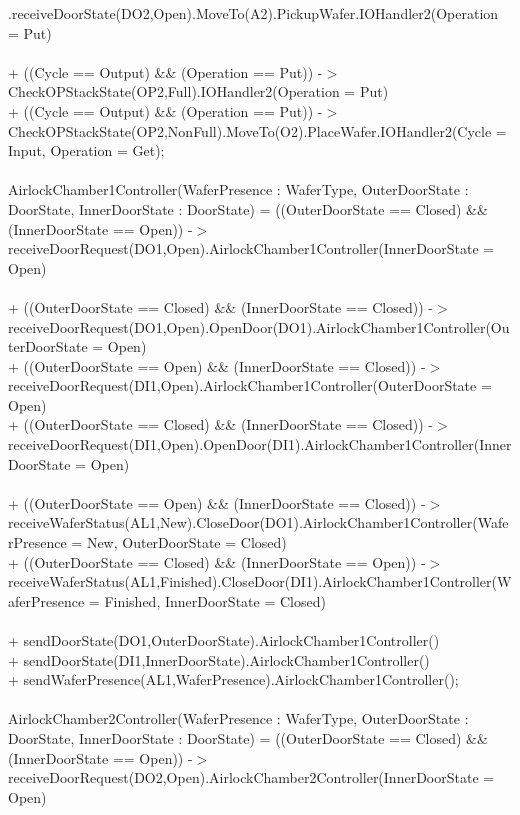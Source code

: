 \documentclass[a4paper,12pt]{article}
\begin{document}
.receiveDoorState(DO2,Open).MoveTo(A2).PickupWafer.IOHandler2(Operation = Put)
\\
\\+ ((Cycle == Output) \&\& (Operation == Put)) -$>$ CheckOPStackState(OP2,Full).IOHandler2(Operation = Put)
\\+ ((Cycle == Output) \&\& (Operation == Put)) -$>$ CheckOPStackState(OP2,NonFull).MoveTo(O2).PlaceWafer.IOHandler2(Cycle = Input, Operation = Get);
\\
\\AirlockChamber1Controller(WaferPresence : WaferType, OuterDoorState : DoorState, InnerDoorState : DoorState) =
((OuterDoorState == Closed) \&\& (InnerDoorState == Open)) -$>$ receiveDoorRequest(DO1,Open).AirlockChamber1Controller(InnerDoorState = Open)
\\
\\+ ((OuterDoorState == Closed) \&\& (InnerDoorState == Closed)) -$>$ receiveDoorRequest(DO1,Open).OpenDoor(DO1).AirlockChamber1Controller(OuterDoorState = Open)
\\+ ((OuterDoorState == Open) \&\& (InnerDoorState == Closed)) -$>$ receiveDoorRequest(DI1,Open).AirlockChamber1Controller(OuterDoorState = Open)
\\+ ((OuterDoorState == Closed) \&\& (InnerDoorState == Closed)) -$>$ receiveDoorRequest(DI1,Open).OpenDoor(DI1).AirlockChamber1Controller(InnerDoorState = Open)
\\
\\+ ((OuterDoorState == Open) \&\& (InnerDoorState == Closed)) -$>$ receiveWaferStatus(AL1,New).CloseDoor(DO1).AirlockChamber1Controller(WaferPresence = New, OuterDoorState = Closed)
\\+ ((OuterDoorState == Closed) \&\& (InnerDoorState == Open)) -$>$ receiveWaferStatus(AL1,Finished).CloseDoor(DI1).AirlockChamber1Controller(WaferPresence = Finished, InnerDoorState = Closed)
\\
\\+ sendDoorState(DO1,OuterDoorState).AirlockChamber1Controller()
\\+ sendDoorState(DI1,InnerDoorState).AirlockChamber1Controller()
\\+ sendWaferPresence(AL1,WaferPresence).AirlockChamber1Controller();
\\
\\AirlockChamber2Controller(WaferPresence : WaferType, OuterDoorState : DoorState, InnerDoorState : DoorState) =
((OuterDoorState == Closed) \&\& (InnerDoorState == Open)) -$>$ receiveDoorRequest(DO2,Open).AirlockChamber2Controller(InnerDoorState = Open)
\end{document}

